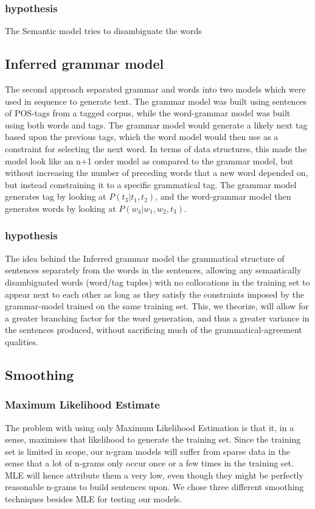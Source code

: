 \documentclass[a4paper,12pt]{article}
\begin{document}
\subsubsection{hypothesis}
The Semantic model tries to disambiguate the words 

\subsection{Inferred grammar model}
The second approach separated grammar and words into two models which were used in sequence to generate text. The grammar model was built using sentences of POS-tags from a tagged corpus, while the word-grammar model was built using both words and tags. The grammar model would generate a likely next tag based upon the previous tags, which the word model would then use as a constraint for selecting the next word. In terms of data structures, this made the model look like an n+1 order model as compared to the grammar model, but without increasing the number of preceding words that a new word depended on, but instead constraining it to a specific grammatical tag.
The grammar model generates tag by looking at $P(t_3|t_1,t_2)$, and the word-grammar model then generates words by looking at $P(w_3|w_1,w_2,t_3)$.

\subsubsection{hypothesis}
The idea behind the Inferred grammar model the grammatical structure of sentences separately from the words in the sentences, allowing any semantically disambiguated words (word/tag tuples) with no collocations in the training set to appear next to each other as long as they satisfy the constraints imposed by the grammar-model trained on the same training set. This, we theorize, will allow for a greater branching factor for the word generation, and thus a greater variance in the sentences produced, without sacrificing much of the grammatical-agreement qualities.

\subsection{Smoothing}


\subsubsection{Maximum Likelihood Estimate}
The problem with using only Maximum Likelihood Estimation is that it, in a sense, maximises that likelihood to generate the training set. Since the training set is limited in scope, our n-gram models will suffer from sparse data in the sense that a lot of n-grams only occur once or a few times in the training set. MLE will hence attribute them a very low, even though they might be perfectly reasonable n-grams to build sentences upon. We chose three different smoothing techniques besides MLE for testing our models.
\end{document}
